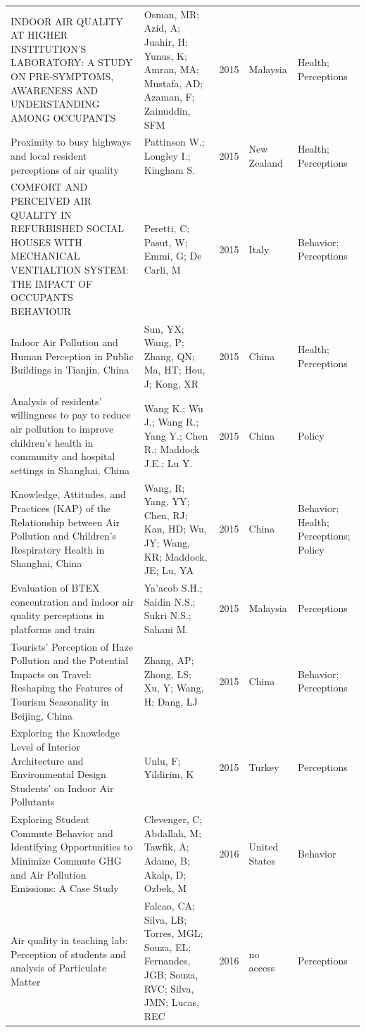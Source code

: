{\begin{longtable}[t]{p{6cm}p{3cm}lp{3cm}p{3cm}}
\addlinespace
INDOOR AIR QUALITY AT HIGHER INSTITUTION'S LABORATORY: A STUDY ON PRE-SYMPTOMS, AWARENESS AND UNDERSTANDING AMONG OCCUPANTS & Osman, MR; Azid, A; Juahir, H; Yunus, K; Amran, MA; Mustafa, AD; Azaman, F; Zainuddin, SFM & 2015 & Malaysia & Health; Perceptions\\
Proximity to busy highways and local resident perceptions of air quality & Pattinson W.; Longley I.; Kingham S. & 2015 & New Zealand & Health; Perceptions\\
COMFORT AND PERCEIVED AIR QUALITY IN REFURBISHED SOCIAL HOUSES WITH MECHANICAL VENTIALTION SYSTEM: THE IMPACT OF OCCUPANTS BEHAVIOUR & Peretti, C; Pasut, W; Emmi, G; De Carli, M & 2015 & Italy & Behavior; Perceptions\\
Indoor Air Pollution and Human Perception in Public Buildings in Tianjin, China & Sun, YX; Wang, P; Zhang, QN; Ma, HT; Hou, J; Kong, XR & 2015 & China & Health; Perceptions\\
Analysis of residents' willingness to pay to reduce air pollution to improve children's health in community and hospital settings in Shanghai, China & Wang K.; Wu J.; Wang R.; Yang Y.; Chen R.; Maddock J.E.; Lu Y. & 2015 & China & Policy\\
\addlinespace
Knowledge, Attitudes, and Practices (KAP) of the Relationship between Air Pollution and Children's Respiratory Health in Shanghai, China & Wang, R; Yang, YY; Chen, RJ; Kan, HD; Wu, JY; Wang, KR; Maddock, JE; Lu, YA & 2015 & China & Behavior; Health; Perceptions; Policy\\
Evaluation of BTEX concentration and indoor air quality perceptions in platforms and train & Ya'acob S.H.; Saidin N.S.; Sukri N.S.; Sahani M. & 2015 & Malaysia & Perceptions\\
Tourists' Perception of Haze Pollution and the Potential Impacts on Travel: Reshaping the Features of Tourism Seasonality in Beijing, China & Zhang, AP; Zhong, LS; Xu, Y; Wang, H; Dang, LJ & 2015 & China & Behavior; Perceptions\\
Exploring the Knowledge Level of Interior Architecture and Environmental Design Students' on Indoor Air Pollutants & Unlu, F; Yildirim, K & 2015 & Turkey & Perceptions\\
Exploring Student Commute Behavior and Identifying Opportunities to Minimize Commute GHG and Air Pollution Emissions: A Case Study & Clevenger, C; Abdallah, M; Tawfik, A; Adame, B; Akalp, D; Ozbek, M & 2016 & United States & Behavior\\
\addlinespace
Air quality in teaching lab: Perception of students and analysis of Particulate Matter & Falcao, CA; Silva, LB; Torres, MGL; Souza, EL; Fernandes, JGB; Souza, RVC; Silva, JMN; Lucas, REC & 2016 & no access & Perceptions\\

\end{longtable}}
